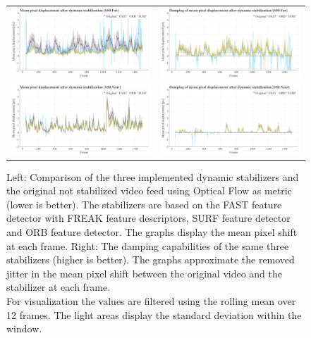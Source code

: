 \begin{figure}[!ht]
\begin{tabular}{cc}
      \includegraphics[width=0.475\linewidth]{diagrams/optical_flow/mean_pixel_shifts_after_dynamic_stabilization_s50_far.png}    &  
      \includegraphics[width=0.475\linewidth]{diagrams/optical_flow/damping_mean_pixel_shifts_after_dynamic_stabilization_s50_far.png}    \\

      \includegraphics[width=0.475\linewidth]{diagrams/optical_flow/mean_pixel_shifts_after_dynamic_stabilization_s50_near.png}    &  
      \includegraphics[width=0.475\linewidth]{diagrams/optical_flow/damping_mean_pixel_shifts_after_dynamic_stabilization_s50_near.png}    
    \end{tabular}
    \caption{
        Left: 
        Comparison of the three implemented dynamic stabilizers and the original not stabilized video feed using Optical Flow as metric (lower is better).
        The stabilizers are based on the 
        FAST \cite{Ghahremani_2021,opencv_library} feature detector with FREAK \cite{alahi6247715,opencv_library} feature descriptors,
        SURF \cite{bay10.1007/11744023_32,opencv_library} feature detector and
        ORB \cite{rublee6126544, opencv_library} feature detector.
        The graphs display the mean pixel shift at each frame. 
        Right: 
        The damping capabilities of the same three stabilizers (higher is better). 
        The graphs approximate the removed jitter in the mean pixel shift between the original video and the stabilizer at each frame.\\
        For visualization the values are filtered using the rolling mean over 12 frames. 
        The light areas display the standard deviation within the window.
    }
    \label{fig:dynamic_stabilization_appendix}
    \end{figure}

